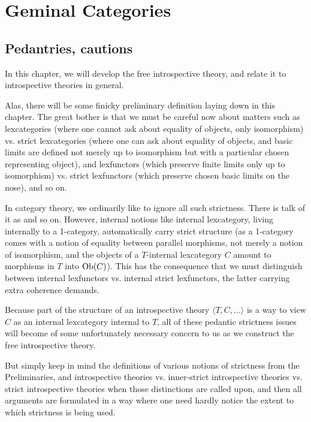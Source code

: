\section{Geminal Categories}

\subsection{Pedantries, cautions}

In this chapter, we will develop the free introspective theory, and relate it to introspective theories in general. 

Alas, there will be some finicky preliminary definition laying down in this chapter. The great bother is that we must be careful now about matters such as lexcategories (where one cannot ask about equality of objects, only isomorphism) vs. strict lexcategories (where one can ask about equality of objects, and basic limits are defined not merely up to isomorphism but with a particular chosen representing object), and lexfunctors (which preserve finite limits only up to isomorphism) vs. strict lexfunctors (which preserve chosen basic limits on the nose), and so on.

In category theory, we ordinarily like to ignore all such strictness. There is talk of it as  and so on. However, internal notions like internal lexcategory, living internally to a 1-category, automatically carry strict structure (as a 1-category comes with a notion of equality between parallel morphisms, not merely a notion of isomorphism, and the objects of a $T$-internal lexcategory $C$ amount to morphisms in $T$ into $\operatorname{Ob}(C)$). This has the consequence that we must distinguish between internal lexfunctors vs. internal strict lexfunctors, the latter carrying extra coherence demands.

Because part of the structure of an introspective theory $\langle T, C, \ldots \rangle$ is a way to view $C$ as an internal lexcategory internal to $T$, all of these pedantic strictness issues will become of some unfortunately necessary concern to us as we construct the free introspective theory.

But simply keep in mind the definitions of various notions of strictness from the Preliminaries, and introspective theories vs. inner-strict introspective theories vs. strict introspective theories when those distinctions are called upon, and then all arguments are formulated in a way where one need hardly notice the extent to which strictness is being used.

